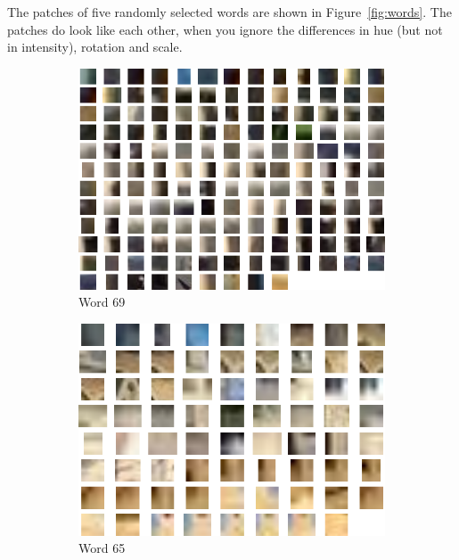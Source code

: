 \documentclass[a4paper,10pt]{article}
\begin{document}
The patches of five randomly selected words are shown in Figure~\ref{fig:words}.  The patches do look like each other, when you ignore the differences in hue (but not in intensity), rotation and scale.

\begin{figure}
  \begin{subfigure}{0.49\textwidth}
    \centering
    \includegraphics[width=\textwidth,height=.3\textheight,keepaspectratio]{word1}
    \caption{Word 69}
  \end{subfigure}
  \begin{subfigure}{0.49\textwidth}
    \centering
    \includegraphics[width=\textwidth,height=.3\textheight,keepaspectratio]{word2}
    \caption{Word 65}
  \end{subfigure}
  \begin{subfigure}{0.49\textwidth}

\end{subfigure}
\end{figure}
\end{document}
